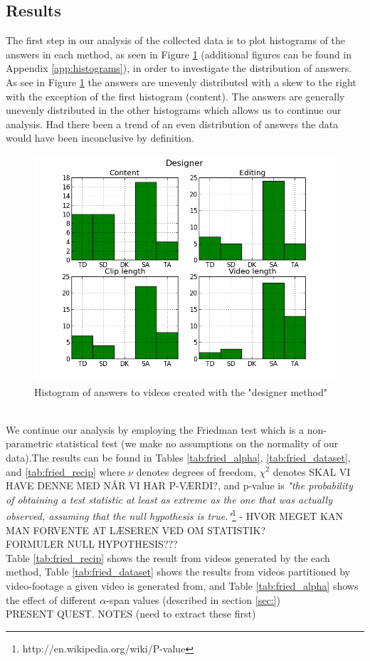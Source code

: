 \subsection{Results}
%
The first step in our analysis of the collected data is to plot histograms of the answers in each method, as seen in Figure \ref{fig:hist_design} (additional figures can be found in Appendix \ref{app:histograms}), in order to investigate the distribution of answers. As see in Figure \ref{fig:hist_design} the answers are unevenly distributed with a skew to the right with the exception of the first histogram (content). The answers are generally unevenly distributed in the other histograms which allows us to continue our analysis. Had there been a trend of an even distribution of answers the data would have been inconclusive by definition.
%
\begin{figure}
     \centering
     \includegraphics[width=1.0\textwidth]{img/designer_barplot.png}
     \caption{Histogram of answers to videos created with the "designer method"}\label{fig:hist_design}
\end{figure}\\
%
We continue our analysis by employing the Friedman test which is a non-parametric statistical test (we make no assumptions on the normality of our data).The results can be found in Tables \ref{tab:fried_alpha}, \ref{tab:fried_dataset}, and \ref{tab:fried_recip} where $\nu$ denotes degrees of freedom, $\chi^2$ denotes SKAL VI HAVE DENNE MED NÅR VI HAR P-VÆRDI?, and p-value is \textit{"the probability of obtaining a test statistic at least as extreme as the one that was actually observed, assuming that the null hypothesis is true."}\footnote{http://en.wikipedia.org/wiki/P-value} - HVOR MEGET KAN MAN FORVENTE AT LÆSEREN VED OM STATISTIK?\\
FORMULER NULL HYPOTHESIS???\\
%



%
Table \ref{tab:fried_recip} shows the result from videos generated by the each method, Table \ref{tab:fried_dataset} shows the results from videos partitioned by video-footage a given video is generated from, and Table \ref{tab:fried_alpha} shows the effect of different $\alpha$-span values (described in section \ref{sec:})\\
%
PRESENT QUEST. NOTES (need to extract these first)
%
